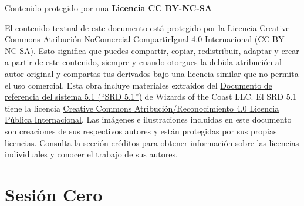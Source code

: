 \documentclass[10pt,twoside,twocolumn,openany]{dndbook}
\begin{document}
\begin{center}
  \vspace*{\fill} %
  \begin{minipage}[b]{\textwidth}
      \justifying %
      \noindent %
      \faCreativeCommons \faCreativeCommonsBy \faCreativeCommonsNc \faCreativeCommonsSa \hspace{0.5em} 
      Contenido protegido por una \textbf{Licencia CC BY-NC-SA}
      \vspace{1em} %

      {\scriptsize
      \noindent
      El contenido textual de este documento está protegido por la Licencia Creative Commons 
      Atribución-NoComercial-CompartirIgual 4.0 Internacional 
      \href{https://creativecommons.org/licenses/by-nc-sa/4.0/deed.es}{(CC BY-NC-SA)}. Esto 
      significa que puedes compartir, copiar, redistribuir, adaptar y crear a partir de este 
      contenido, siempre y cuando otorgues la debida atribución al autor original y compartas tus 
      derivados bajo una licencia similar que no permita el uso comercial. Esta obra incluye 
      materiales extraídos del 
      \href{https://dnd.wizards.com/es/resources/systems-reference-document}{Documento de 
      referencia del sistema 5.1 (“SRD 5.1”)} de Wizards of the Coast LLC. El SRD 5.1 tiene la 
      licencia \href{https://creativecommons.org/licenses/by/4.0/legalcode.es}
      {Creative Commons Atribución/Reconocimiento 4.0 Licencia Pública Internacional}. 
      Las imágenes e ilustraciones incluidas en este documento son creaciones de sus respectivos 
      autores y están protegidas por sus propias licencias. Consulta la sección créditos para 
      obtener información sobre las licencias individuales y conocer el trabajo de sus autores.      
      }
    \end{minipage}
\end{center}

\frontmatter

\maketitle

\tableofcontents

\mainmatter


\chapter*{Sesión Cero}
\end{document}
